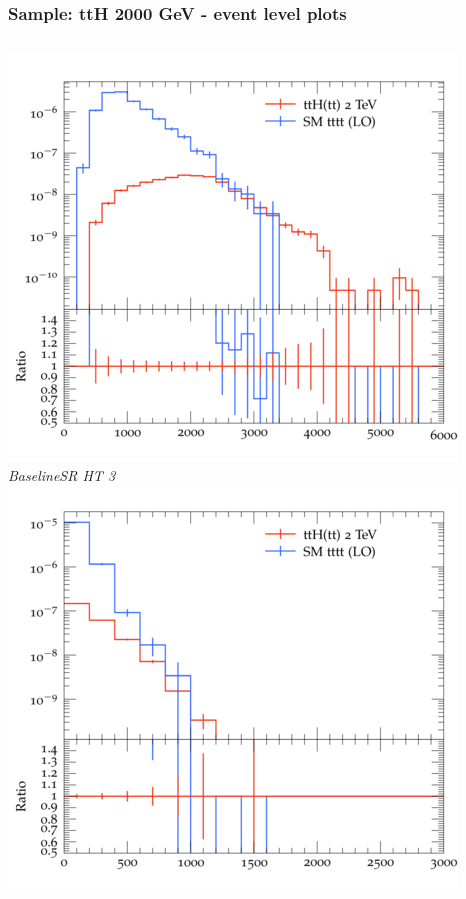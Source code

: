\documentclass{beamer}
\begin{document}
\begin{frame}
\frametitle{Sample: ttH 2000 GeV - event level plots}
\begin{columns}
\includegraphics[width=\textwidth]{../plots/ttH_2000/tttt_ttH_1LOS/BaselineSR_HT_3.png}\\
\textit{\small BaselineSR HT 3}
\includegraphics[width=\textwidth]{../plots/ttH_2000/tttt_ttH_1LOS/BaselineSR_MET.png}\\

\end{columns}
\end{frame}
\end{document}

